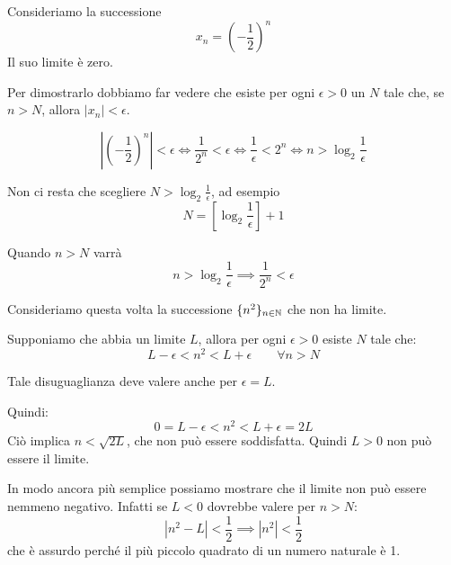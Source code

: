 \begin{example}
Consideriamo la successione
\begin{equation*}
x_n = \left(-\frac{1}{2}\right)^n
\end{equation*}
Il suo limite è zero.

Per dimostrarlo dobbiamo far vedere che esiste per ogni $\epsilon > 0$ un $N$ tale che, se $n > N$, allora $|x_n| < \epsilon$.

\begin{equation*}
\left|\left(-\frac{1}{2}\right)^n\right| < \epsilon \iff \frac{1}{2^n} < \epsilon \iff \frac{1}{\epsilon} < 2^n \iff n > \log_2 \frac{1}{\epsilon}
\end{equation*}

Non ci resta che scegliere $N > \log_2 \frac{1}{\epsilon}$, ad esempio
\begin{equation*}
N = \left[\log_2 \frac{1}{\epsilon}\right] + 1
\end{equation*}

Quando $n > N$ varrà
\begin{equation*}
n > \log_2 \frac{1}{\epsilon} \implies \frac{1}{2^n} < \epsilon
\end{equation*}
\end{example}

\begin{example}
Consideriamo questa volta la successione $\{n^2\}_{n \in \mathbb N}$ che non ha limite.

Supponiamo che abbia un limite $L$, allora per ogni $\epsilon > 0$ esiste $N$ tale che:
\begin{equation*}
L - \epsilon < n^2 < L + \epsilon	\qquad	\forall n  > N
\end{equation*}

Tale disuguaglianza deve valere anche per $\epsilon = L$.

Quindi:
\begin{equation*}
0 = L - \epsilon < n^2 < L + \epsilon = 2L
\end{equation*}
Ciò implica $n < \sqrt{2L}$, che non può essere soddisfatta.
Quindi $L > 0$ non può essere il limite.

In modo ancora più semplice possiamo mostrare che il limite non può essere nemmeno negativo. Infatti se $L < 0$ dovrebbe valere per $n > N$:
\begin{equation*}
|n^2 - L| < \frac{1}{2} \implies |n^2| < \frac{1}{2}
\end{equation*}
che è assurdo perché il più piccolo quadrato di un numero naturale è 1.
\end{example}

